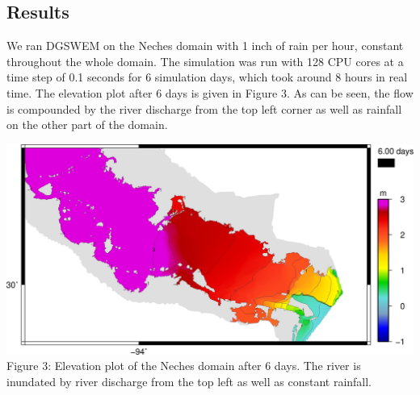 \documentclass[american]{article}
\begin{document}
\begin{multicols}{3}
\section*{Results}
We ran DGSWEM on the Neches domain with 1 inch of rain per hour, constant throughout the whole domain. The simulation was run with 128 CPU cores at a time step of 0.1 seconds for 6 simulation days, which took around 8 hours in real time. The elevation plot after 6 days is given in Figure 3. As can be seen, the flow is compounded by the river discharge from the top left corner as well as rainfall on the other part of the domain.
\begin{center}
    \vspace{0.5cm}
    \includegraphics[width=0.95 \linewidth]{media/rain.jpg}
    Figure 3: Elevation plot of the Neches domain after 6 days. The river is inundated by river discharge from the top left as well as constant rainfall.
\end{center}


\end{multicols}
\end{document}
